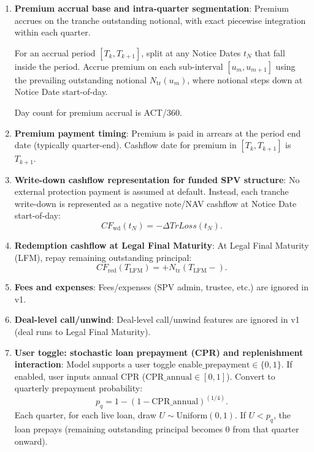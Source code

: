 \documentclass[11pt]{article}
\begin{document}
\begin{enumerate}[label=\arabic*),leftmargin=*,align=left]
Loss is recognized into CumLoss at Notice Date (Default Date + 1 calendar month, with business-day adjustment), with write-down effective at Notice Date start-of-day.

\item \textbf{Premium accrual base and intra-quarter segmentation}: Premium accrues on the tranche outstanding notional, with exact piecewise integration within each quarter.

For an accrual period $[T_k, T_{k+1}]$, split at any Notice Dates $t_N$ that fall inside the period. Accrue premium on each sub-interval $[u_m, u_{m+1}]$ using the prevailing outstanding notional $N_{\text{tr}}(u_m)$, where notional steps down at Notice Date start-of-day.

Day count for premium accrual is ACT/360.

\item \textbf{Premium payment timing}: Premium is paid in arrears at the period end date (typically quarter-end). Cashflow date for premium in $[T_k, T_{k+1}]$ is $T_{k+1}$.

\item \textbf{Write-down cashflow representation for funded SPV structure}: No external protection payment is assumed at default. Instead, each tranche write-down is represented as a negative note/NAV cashflow at Notice Date start-of-day:
\[ CF_{\text{wd}}(t_N) = -\Delta TrLoss(t_N). \]

\item \textbf{Redemption cashflow at Legal Final Maturity}: At Legal Final Maturity (LFM), repay remaining outstanding principal:
\[ CF_{\text{red}}(T_{\text{LFM}}) = +N_{\text{tr}}(T_{\text{LFM}}-). \]

\item \textbf{Fees and expenses}: Fees/expenses (SPV admin, trustee, etc.) are ignored in v1.

\item \textbf{Deal-level call/unwind}: Deal-level call/unwind features are ignored in v1 (deal runs to Legal Final Maturity).

\item \textbf{User toggle: stochastic loan prepayment (CPR) and replenishment interaction}: Model supports a user toggle $\text{enable\_prepayment} \in \{0,1\}$. If enabled, user inputs annual CPR ($\text{CPR\_annual} \in [0,1]$). Convert to quarterly prepayment probability:
\[ p_q = 1 - (1 - \text{CPR\_annual})^{(1/4)}. \]
Each quarter, for each live loan, draw $U \sim \text{Uniform}(0,1)$. If $U < p_q$, the loan prepays (remaining outstanding principal becomes 0 from that quarter onward).


\end{enumerate}
\end{document}

